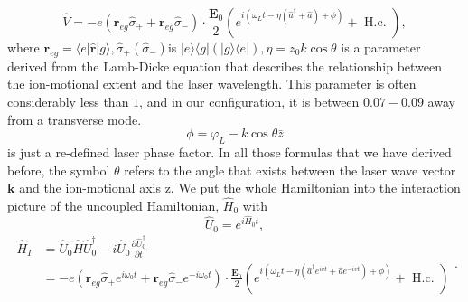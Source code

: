 \begin{equation}
    \hat{V}=-e\left(\mathbf{r}_{e g} \hat{\sigma}_{+}+\mathbf{r}_{e g} \hat{\sigma}_{-}\right) \cdot \frac{\mathbf{E}_0}{2}\left(e^{i\left(\omega_L t-\eta\left(\hat{a}^{\dagger}+\hat{a}\right)+\phi\right)}+\text { H.c. }\right),
\end{equation}
where $\mathbf{r}_{e g}=\langle e|\hat{\mathbf{r}}| g\rangle, \hat{\sigma}_{+}\left(\hat{\sigma}_{-}\right)$is $|e\rangle\langle g|(|g\rangle\langle e|), \eta=z_0 k \cos \theta$ is a parameter derived from the Lamb-Dicke equation that describes the relationship between the ion-motional extent and the laser wavelength. This parameter is often considerably less than $1$, and in our configuration, it is between $0.07-0.09$ away from a transverse mode.
\begin{equation}
    \phi = \varphi_L - k\cos{\theta} \bar{z}
\end{equation}
is just a re-defined laser phase factor. In all those formulas that we have derived before, the symbol $\theta$ refers to the angle that exists between the laser wave vector $\mathbf{k}$ and the ion-motional axis z. We put the whole Hamiltonian into the interaction picture of the uncoupled Hamiltonian, $\hat{H}_0$ with
\begin{equation}
    \hat{U}_0= e^{i \hat{H}_0 t},
\end{equation}
\begin{equation}
    \begin{aligned}
        \hat{H}_I & =\hat{U}_0 \hat{H} \hat{U}_0^{\dagger}-i \hat{U}_0 \frac{\partial \hat{U}_0^{\dagger}}{\partial t}                                                                                                                                                                               \\
                  & =-e\left(\mathbf{r}_{e g} \hat{\sigma}_{+} e^{i \omega_0 t}+\mathbf{r}_{e g} \hat{\sigma}_{-} e^{-i \omega_0 t}\right) \cdot \frac{\mathbf{E}_0}{2}\left(e^{i\left(\omega_L t-\eta\left(\hat{a}^{\dagger} e^{i v t}+\hat{a} e^{-i v t}\right)+\phi\right)}+\text { H.c. }\right)
    \end{aligned}
    .
\end{equation}

